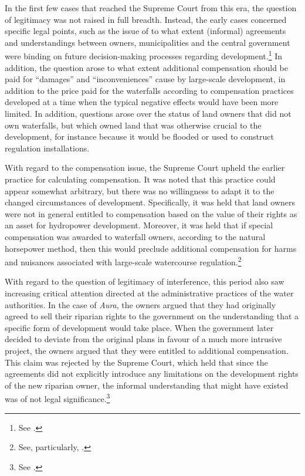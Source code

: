 In the first few cases that reached the Supreme Court from this era, the question of legitimacy was not raised in full breadth. Instead, the early cases concerned specific legal points, such as the issue of to what extent (informal) agreements and understandings between owners, municipalities and the central government were binding on future decision-making processes regarding development.\footnote{See \cite{61,mardøla73}.} In addition, the question arose to what extent additional compensation should be paid for ``damages'' and ``inconveniences'' cause by large-scale development, in addition to the price paid for the waterfalls according to compensation practices developed at a time when the typical negative effects would have been more limited. In addition, questions arose over the status of land owners that did not own waterfalls, but which owned land that was otherwise crucial to the development, for instance because it would be flooded or used to construct regulation installations.

With regard to the compensation issue, the Supreme Court upheld the earlier practice for calculating compensation. It was noted that this practice could appear somewhat arbitrary, but there was no willingness to adapt it to the changed circumstances of development. Specifically, it was held that land owners were not in general entitled to compensation based on the value of their rights as an asset for hydropower development. Moreover, it was held that if special compensation was awarded to  waterfall owners, according to the natural horsepower method, then this would preclude additional compensation for harms and nuisances associated with large-scale watercourse regulation.\footnote{See, particularly, \cite{....}.} 

With regard to the question of legitimacy of interference, this period also saw increasing critical attention directed at the administrative practices of the water authorities. In the case of {\it Aura}, the owners argued that they had originally agreed to sell their riparian rights to the government on the understanding that a specific form of development would take place. When the government later decided to deviate from the original plans in favour of a much more intrusive project, the owners argued that they were entitled to additional compensation. This claim was rejected by the Supreme Court, which held that since the agreements did not explicitly introduce any limitations on the development rights of the new riparian owner, the informal understanding that might have existed was of not legal significance.\footnote{See \cite{61}.} 

